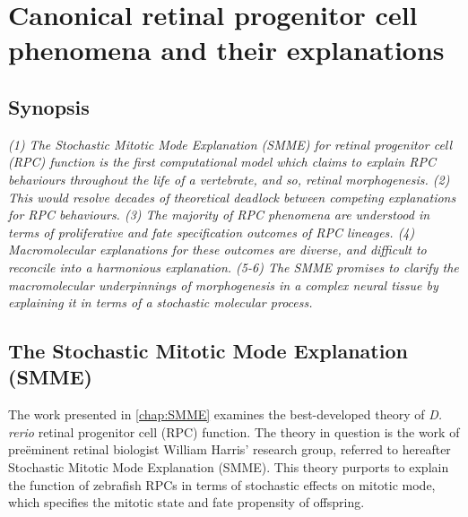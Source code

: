 \chapter{Canonical retinal progenitor cell phenomena and their explanations}
\label{chap:RPCreview}

\section*{Synopsis}
\textit{(1) The Stochastic Mitotic Mode Explanation (SMME) for retinal progenitor cell (RPC) function is the first computational model which claims to explain RPC behaviours throughout the life of a vertebrate, and so, retinal morphogenesis. (2) This would resolve decades of theoretical deadlock between competing explanations for RPC behaviours. (3) The majority of RPC phenomena are understood in terms of proliferative and fate specification outcomes of RPC lineages. (4) Macromolecular explanations for these outcomes are diverse, and difficult to reconcile into a harmonious explanation. (5-6) The SMME promises to clarify the macromolecular underpinnings of morphogenesis in a complex neural tissue by explaining it in terms of a stochastic molecular process.}

\section{The Stochastic Mitotic Mode Explanation (SMME)}
The work presented in \autoref{chap:SMME} examines the best-developed theory of \textit{D. rerio} retinal progenitor cell (RPC) function. The theory in question is the work of pre\"{e}minent retinal biologist William Harris' research group, referred to hereafter Stochastic Mitotic Mode Explanation (SMME). This theory purports to explain the function of zebrafish RPCs in terms of stochastic effects on mitotic mode, which specifies the mitotic state and fate propensity of offspring.

